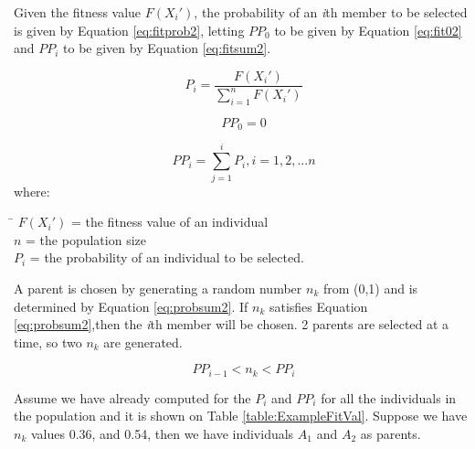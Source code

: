 Given the fitness value $F(X_i')$, the probability of an \emph{i}th member to be selected is given by Equation \ref{eq:fitprob2}, letting $PP_0$ to be given by Equation \ref{eq:fit02} and $PP_i$ to be given by Equation \ref{eq:fitsum2}.

\begin{equation}
	\label{eq:fitprob2}
	P_i = \frac{F(X_i')}{\sum_{i=1}^{n} F(X_i')}
\end{equation}

\begin{equation}
	\label{eq:fit02}
	PP_0=0
\end{equation}

\begin{equation}
	\label{eq:fitsum2}
	PP_i= \sum_{j=1}^i  P_i  , i=1, 2, ... n 
\end{equation}
where:
\begin{tabbing}
	\= \kill
	$F(X_i')$ = the fitness value of an individual\\
	$n$\> = the population size\\
	$P_i$ \> = the probability of an individual to be selected.\\
\end{tabbing}


A parent is chosen by generating a random number \emph{$n_k$} from (0,1) and is determined by Equation \ref{eq:probsum2}. If \emph{$n_k$} satisfies Equation \ref{eq:probsum2},then the \emph{i}th member will be chosen. 2 parents are selected at a time, so two \emph{$n_k$} are generated.\par

\begin{equation}
	\label{eq:probsum2}
	PP_{i-1} < n_k < PP_i
\end{equation}

Assume we have already computed for the \emph{$P_i$} and \emph{$PP_i$} for all the individuals in the population and it is shown on Table \ref{table:ExampleFitVal}. Suppose we have \emph{$n_k$} values 0.36, and 0.54, then we have individuals $A_{1}$ and $A_2$ as parents. 

